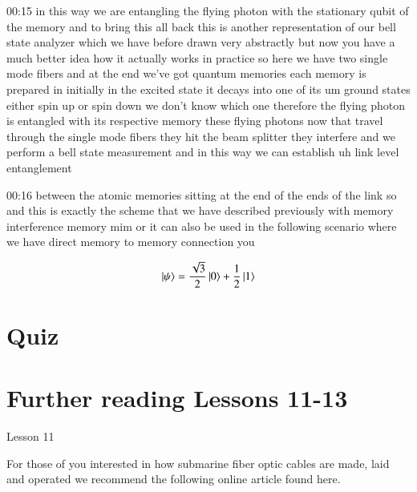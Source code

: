 00:15
in this way we are entangling the flying photon with the stationary qubit of the
memory and to bring this all back this is another representation of our
bell state analyzer which we have before drawn very
abstractly but now you have a much better idea
how it actually works in practice so here we have two single mode fibers
and at the end we've got quantum memories each memory is prepared in
initially in the excited state it decays into one of its um ground states either
spin up or spin down we don't know which one therefore the flying photon is
entangled with its respective memory these flying photons now that
travel through the single mode fibers they hit the beam splitter
they interfere and we perform a bell state measurement
and in this way we can establish uh link level entanglement

00:16
between the atomic memories sitting at the end of the ends of the link
so and this is exactly the scheme that we have described previously
with memory interference memory mim or it can also be used in the following
scenario where we have direct memory to memory connection you


\newpage
\begin{exercises}
\begin{equation*}
\ket{\psi} = \frac{\sqrt{3}}{2}\ket{0} + \frac{1}{2}\ket{1}
\end{equation*}


\end{exercises}

\newpage
\section{Quiz}


\section{Further reading Lessons 11-13}

Lesson 11

For those of you interested in how submarine fiber optic cables are made, laid and operated we recommend the following online article found here.

